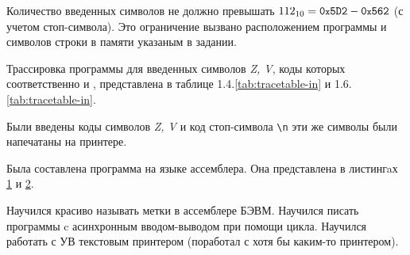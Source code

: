 Количество введенных символов не должно превышать $112_{10}=\texttt{0{\footnotesize{x}}5D2}-\texttt{0{\footnotesize{x}}562}$ (с учетом стоп-символа). Это ограничение вызвано расположением программы и символов строки в памяти указаным в задании.


Трассировка программы для введенных символов \textit{Z, V}, коды которых соответственно  и , представлена в таблице 1.4.\ref{tab:tracetable-in} и 1.6.\ref{tab:tracetable-in}.

Были введены коды символов \textit{Z, V} и код стоп-символа \verb|\n| эти же символы были напечатаны на принтере.

Была составлена программа на языке ассемблера. Она представлена в листингaх \ref{lst:script-setup-and-read} и \ref{lst:script-print-subfunc}.

\begin{figure}[h] %
    \begin{center}
        
    \end{center}
    \label{lst:script-setup-and-read}
\end{figure}

\begin{figure}[h] %
    \begin{center}
        
    \end{center}
    \label{lst:script-print-subfunc}
\end{figure}


Научился красиво называть метки в ассемблере БЭВМ. Научился писать программы c асинхронным вводом-выводом при помощи цикла. Научился работать с УВ текстовым принтером (поработал с хотя бы каким-то принтером).

\newpage





